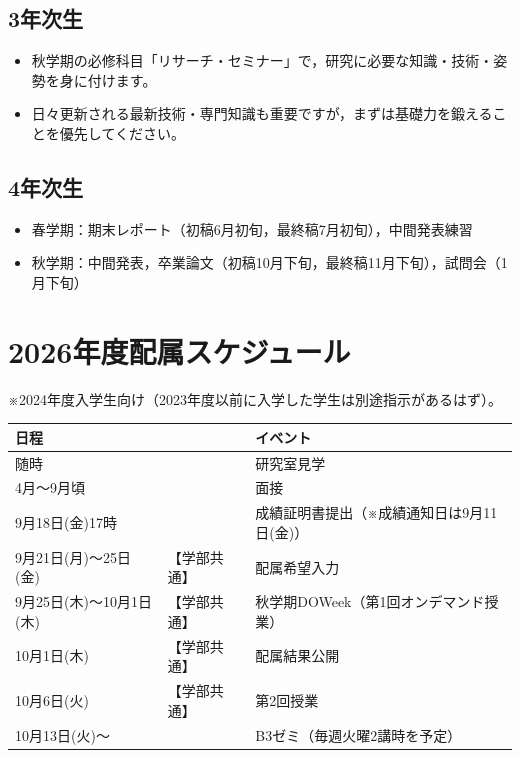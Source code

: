 \documentclass[paper=a4paper,fontsize=10.4pt]{jlreq}
\begin{document}
\subsection*{3年次生}
\vspace{-.2cm}
\begin{itemize}[topsep=0pt]
  \item 秋学期の必修科目「リサーチ・セミナー」で，研究に必要な知識・技術・姿勢を身に付けます。
  \item 日々更新される最新技術・専門知識も重要ですが，まずは基礎力を鍛えることを優先してください。
\end{itemize}

\subsection*{4年次生}
\begin{itemize}[topsep=0pt]
  \item 春学期：期末レポート（初稿6月初旬，最終稿7月初旬），中間発表練習
  \item 秋学期：中間発表，卒業論文（初稿10月下旬，最終稿11月下旬），試問会（1月下旬）
\end{itemize}

\section{2026年度配属スケジュール}

\noindent
※2024年度入学生向け（2023年度以前に入学した学生は別途指示があるはず）。

\begin{table}[h]
\centering
\begin{tabular}{lll}
\hline
日程 && イベント \\
\hline
随時 && 研究室見学 \\
4月～9月頃 && 面接 \\
9月18日(金)17時 && 成績証明書提出（※成績通知日は9月11日(金)） \\
9月21日(月)～25日(金) & 【学部共通】 & 配属希望入力 \\
9月25日(木)～10月1日(木) & 【学部共通】 & 秋学期DOWeek（第1回オンデマンド授業） \\
10月1日(木) & 【学部共通】 & 配属結果公開 \\
10月6日(火) & 【学部共通】 & 第2回授業 \\
10月13日(火)～ && B3ゼミ（毎週火曜2講時を予定） \\
\hline
\end{tabular}
\end{table}
\end{document}
